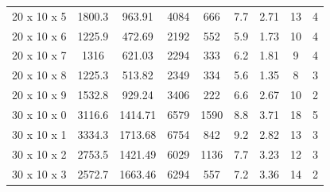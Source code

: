\documentclass{article}
\begin{document}
\begin{table}[]
\begin{tabular}{lcccccccc}
	     		20 x 10 x 5                     & 1800.3                       & 963.91                       & 4084                     & 666                      & 7.7                          & 2.71                         & 13                       & 4                        \\
	     		20 x 10 x 6                     & 1225.9                       & 472.69                       & 2192                     & 552                      & 5.9                          & 1.73                         & 10                       & 4                        \\
	     		20 x 10 x 7                     & 1316                         & 621.03                       & 2294                     & 333                      & 6.2                          & 1.81                         & 9                        & 4                        \\
	     		20 x 10 x 8                     & 1225.3                       & 513.82                       & 2349                     & 334                      & 5.6                          & 1.35                         & 8                        & 3                        \\
	     		20 x 10 x 9                     & 1532.8                       & 929.24                       & 3406                     & 222                      & 6.6                          & 2.67                         & 10                       & 2                        \\
	     		30 x 10 x 0                     & 3116.6                       & 1414.71                      & 6579                     & 1590                     & 8.8                          & 3.71                         & 18                       & 5                        \\
	     		30 x 10 x 1                     & 3334.3                       & 1713.68                      & 6754                     & 842                      & 9.2                          & 2.82                         & 13                       & 3                        \\
	     		30 x 10 x 2                     & 2753.5                       & 1421.49                      & 6029                     & 1136                     & 7.7                          & 3.23                         & 12                       & 3                        \\
	     		30 x 10 x 3                     & 2572.7                       & 1663.46                      & 6294                     & 557                      & 7.2                          & 3.36                         & 14                       & 2                        \\

\end{tabular}
\end{table}
\end{document}
